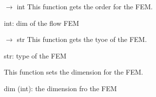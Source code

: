 \documentclass[letterpaper,10pt,english]{sphinxmanual}
\begin{document}
\begin{fulllineitems}
\begin{fulllineitems}
\end{fulllineitems}


\begin{fulllineitems}
\label{\detokenize{scrimp:scrimp.fem.FEM.get_order}}
\pysigstartsignatures
\pysiglinewithargsret
{}
{}
{{ $\rightarrow$ int}}
\pysigstopsignatures
\sphinxAtStartPar
This function gets the order for the FEM.
\begin{description}
\sphinxAtStartPar
int: dim of the flow FEM

\end{description}

\end{fulllineitems}


\begin{fulllineitems}
\label{\detokenize{scrimp:scrimp.fem.FEM.get_type}}
\pysigstartsignatures
\pysiglinewithargsret
{}
{}
{{ $\rightarrow$ str}}
\pysigstopsignatures
\sphinxAtStartPar
This function gets the tyoe of the FEM.
\begin{description}
\sphinxAtStartPar
str: type of the FEM

\end{description}

\end{fulllineitems}


\begin{fulllineitems}
\label{\detokenize{scrimp:scrimp.fem.FEM.set_dim}}
\pysigstartsignatures
\pysiglinewithargsret
{}
{}
{}
\pysigstopsignatures
\sphinxAtStartPar
This function sets the dimension for the FEM.
\begin{description}
\sphinxAtStartPar
dim (int): the dimension fro the FEM

\end{description}

\end{fulllineitems}


\end{fulllineitems}
\end{document}
